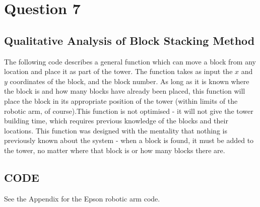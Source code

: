 \pagebreak
\section{Question 7}
	\subsection{Qualitative Analysis of Block Stacking Method}
	The following code describes a general function which can move a block from any location and place it as part of the tower. The function takes as input the $ x $ and $ y $ coordinates of the block, and the block number. As long as it is known where the block is and how many blocks have already been placed, this function will place the block in its appropriate position of the tower (within limits of the robotic arm, of course).\newline This function is not optimised - it will not give the tower building time, which requires previous knowledge of the blocks and their locations. This function was designed with the mentality that nothing is previously known about the system - when a block is found, it must be added to the tower, no matter where that block is or how many blocks there are.\newline
	\subsection{CODE}
	See the Appendix for the Epson robotic arm code.